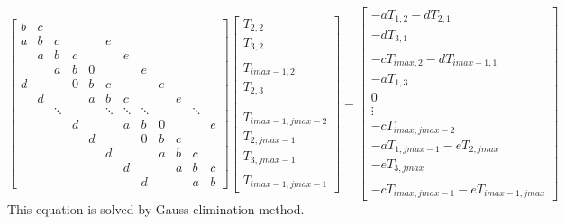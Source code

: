 \documentclass[letterpaper,12pt]{article}
\begin{document}
\begin{equation}
	\begin{bmatrix}
		b & c &       &   &   &       &       &       &   &   &       &   \\
		a & b & c     &   &   & e     &       &       &   &   &       &   \\
		  & a & b     & c &   &       & e     &       &   &   &       &   \\
		  &   & a     & b & 0 &       &       & e     &   &   &       &   \\
		d &   &       & 0 & b & c     &       &       & e &   &       &   \\
		  & d &       &   & a & b     & c     &       &   & e &       &   \\
		  &   &\ddots &   &   &\ddots &\ddots &\ddots &   &   &\ddots &   \\
		  &   &       & d &   &       & a     & b     & 0 &   &       & e \\
		  &   &       &   & d &       &       & 0     & b & c &       &   \\
		  &   &       &   &   & d     &       &       & a & b & c     &   \\ 
		  &   &       &   &   &       & d     &       &   & a & b     & c \\
		  &   &       &   &   &       &       & d     &   &   & a     & b     
		\end{bmatrix}
	\begin{bmatrix}
		T_{2,2}\\
		T_{3,2} \\
		 \\
		T_{imax-1,2} \\
		T_{2,3} \\
		 \\
		 \\
		 T_{imax-1,jmax-2}\\
		 T_{2,jmax-1}\\
		 T_{3,jmax-1} \\ 
		  \\
		  T_{imax-1,jmax-1}
		\end{bmatrix}
	=
	\begin{bmatrix}
		-aT_{1,2}-dT_{2,1}\\
		-dT_{3,1}\\
		  \\
		-cT_{imax,2}-dT_{imax-1,1} \\
		-aT_{1,3} \\
		0 \\
		\vdots\\
		-cT_{imax,jmax-2}\\
		-aT_{1,jmax-1}-eT_{2,jmax}\\
		-eT_{3,jmax}\\ 
		 \\
		 -cT_{imax,jmax-1}-eT_{imax-1,jmax}  
	\end{bmatrix}
	\label{eqn:matrx}
\end{equation}
This equation is solved by Gauss elimination method.
\end{document}
